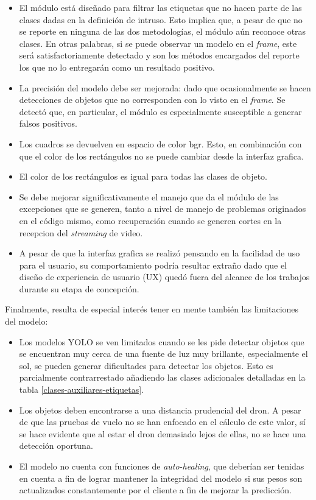 \begin{itemize}

	\item El módulo está diseñado para filtrar las etiquetas que no hacen parte de las clases dadas en la definición de intruso. Esto implica que, a pesar de que no se reporte en ninguna de las dos metodologías, el módulo aún reconoce otras clases. En otras palabras, si se puede observar un modelo en el \textit{frame}, este será satisfactoriamente detectado y son los métodos encargados del reporte los que no lo entregarán como un resultado positivo. 
	\item La precisión del modelo debe ser mejorada: dado que ocasionalmente se hacen detecciones de objetos que no corresponden con lo visto en el \textit{frame}. Se detectó que, en particular, el módulo es especialmente susceptible a generar falsos positivos. 
	\item Los cuadros se devuelven en espacio de color bgr. Esto, en combinación con que el color de los rectángulos no se puede cambiar desde la interfaz grafica.
	\item El color de los rectángulos es igual para todas las clases de objeto.
	\item Se debe mejorar significativamente el manejo que da el módulo de las excepciones que se generen, tanto a nivel de manejo de problemas originados en el código mismo, como recuperación cuando se generen cortes en la recepcion del \textit{streaming} de video.
	\item A pesar de que la interfaz grafica se realizó pensando en la facilidad de uso para el usuario, su comportamiento podría resultar extraño dado que el diseño de experiencia de usuario (UX) quedó fuera del alcance de los trabajos durante su etapa de concepción. 

\end{itemize}

Finalmente, resulta de especial interés tener en mente también las limitaciones del modelo:

\begin{itemize}

	\item Los modelos YOLO se ven limitados cuando se les pide detectar objetos que se encuentran muy cerca de una fuente de luz muy brillante, especialmente el sol, se pueden generar dificultades para detectar los objetos. Esto es parcialmente contrarrestado añadiendo las clases adicionales detalladas en la tabla \ref{clases-auxiliares-etiquetas}. 
	\item Los objetos deben encontrarse a una distancia prudencial del dron. A pesar de que las pruebas de vuelo no se han enfocado en el cálculo de este valor, sí se hace evidente que al estar el dron demasiado lejos de ellas, no se hace una detección oportuna. 
	\item El modelo no cuenta con funciones de \textit{auto-healing}, que deberían ser tenidas en cuenta a fin de lograr mantener la integridad del modelo si sus pesos son actualizados constantemente por el cliente a fin de mejorar la predicción. 

\end{itemize}

